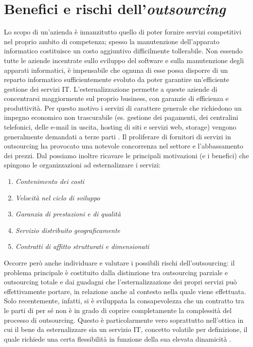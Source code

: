 \documentclass[../main.tex]{subfiles}
\begin{document}
\section{Benefici e rischi dell'\textit{outsourcing}}
Lo scopo di un'azienda è innanzitutto quello di poter fornire servizi competitivi nel proprio ambito di competenza; spesso la  manutenzione dell'apparato informatico costituisce un costo aggiuntivo difficilmente tollerabile.
Non essendo tutte le aziende incentrate sullo sviluppo del software e sulla manutenzione degli apparati informatici, è impensabile che ognuna di esse possa disporre di un reparto informatico sufficientemente evoluto da poter garantire un'efficiente gestione dei servizi IT.
L'esternalizzazione permette a queste aziende di concentrarsi maggiormente sul proprio business, con garanzie di efficienza e produttività.
Per questo motivo i servizi di carattere generale che richiedono un impegno economico non trascurabile (es. gestione dei pagamenti, dei centralini telefonici, delle e-mail in uscita, hosting di siti e servizi web, storage) vengono generalmente demandati a terze parti \cite{OutsourcingCloud}.
Il proliferare di fornitori di servizi in outsourcing ha provocato una notevole concorrenza nel settore e l'abbassamento dei prezzi.
Dal \cite{OutsourcingCloud} possiamo inoltre ricavare le principali motivazioni (e i benefici) che spingono le organizzazioni ad esternalizzare i servizi:
\begin{enumerate}
\item \textit{Contenimento dei costi}
\item \textit{Velocità nel ciclo di sviluppo}
\item \textit{Garanzia di prestazioni e di qualità}
\item \textit{Servizio distribuito geograficamente}
\item \textit{Contratti di affitto strutturati e dimensionati}
\end{enumerate}
Occorre però anche individuare e valutare i possibili rischi dell'outsourcing: il problema principale è costituito dalla distinzione tra outsourcing parziale e outsourcing totale e dai guadagni che l'esternalizzazione dei propri servizi può effettivamente portare, in relazione anche al contesto nella quale viene effettuata.
Solo recentemente, infatti, si è sviluppata la consapevolezza che un contratto tra le parti di per sé non è in grado di coprire completamente la complessità del processo di outsourcing. Questo è particolarmente vero soprattutto nell'ottica in cui il bene da esternalizzare sia un servizio IT, concetto volatile per definizione, il quale richiede una certa flessibilità in funzione della sua elevata dinamicità \cite{OutsourcingCloud2}.
\end{document}
